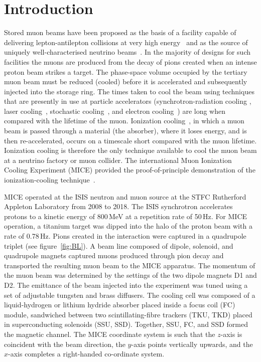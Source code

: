 \section{Introduction}
\label{Sect:Intro}

Stored muon beams have been proposed as the basis of a facility
capable of delivering lepton-antilepton collisions at very high
energy~\cite{Neuffer:1994bt,Palmer:2014nza} and as the source of
uniquely well-characterised neutrino 
beams~\cite{Geer:1998PhRvD..57.6989G,Bandyopadhyay:2007kx,Apollonio:2002en}.
In the majority of designs for such facilities the muons are produced
from the decay of pions created when an intense proton beam strikes a
target.
The phase-space volume occupied by the tertiary muon beam must be
reduced (cooled) before it is accelerated and subsequently injected
into the storage ring.
The times taken to cool the beam using techniques that are presently in
use at particle accelerators (synchrotron-radiation cooling
\cite{2012acph.book.....L}, laser
cooling~\cite{PhysRevLett.64.2901,PhysRevLett.67.1238,doi:10.1063/1.329218},
stochastic cooling~\cite{Marriner:2003mn}, and electron
cooling~\cite{1063-7869-43-5-R01}) are long when compared with the
lifetime of the muon.
Ionization cooling~\cite{cooling_methods,Neuffer:1983jr}, in which a
muon beam is passed through a material (the absorber), where it
loses energy, and is then re-accelerated, occurs on a timescale short
compared with the muon lifetime.
Ionization cooling is therefore the only technique available to cool the muon beam at a neutrino factory or muon collider.
The international Muon Ionization Cooling Experiment (MICE)
provided the proof-of-principle demonstration of the
ionization-cooling technique~\cite{Bogomilov:2019kfj}.

MICE operated at the ISIS neutron and muon source at the STFC
Rutherford Appleton Laboratory from 2008 to 2018.  
The ISIS synchrotron accelerates protons to a kinetic energy of 800\,MeV at a repetition rate of
50\,Hz.
For MICE operation, a titanium target was dipped
into the halo of the proton beam with a rate of 0.78\,Hz. 
Pions created in the interaction were captured in a quadrupole triplet
(see figure~\ref{fig:BL}).
A beam line composed of dipole, solenoid, and quadrupole
magnets captured muons produced through pion decay and transported the
resulting muon beam to the MICE apparatus.
The momentum of the muon beam was determined by the settings of the two dipole magnets D1 and D2.
The emittance of the beam injected into the experiment was tuned using
a set of adjustable tungsten and brass diffusers.
The cooling cell was composed of a liquid-hydrogen or lithium hydride
absorber placed inside a focus coil (FC) module, sandwiched between
two scintillating-fibre trackers (TKU, TKD) placed in superconducting
solenoids (SSU, SSD).
Together, SSU, FC, and SSD formed the magnetic channel.
The MICE coordinate system is such that the $z$-axis is coincident
with the beam direction, the $y$-axis points vertically upwards, and the
$x$-axis completes a right-handed co-ordinate system.

